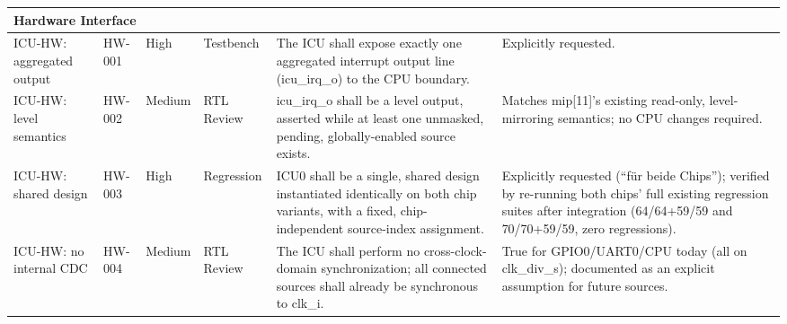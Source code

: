 \begin{longtable}{| p{} | p{} | p{} | p{} | p{} | p{} |}
\multicolumn{6}{|l|}{Hardware Interface}\\
\hline
ICU-HW: aggregated output & HW-001 & High & Testbench &
  The ICU shall expose exactly one aggregated interrupt output line
  (icu\_irq\_o) to the CPU boundary. &
  Explicitly requested. \\
\hline
ICU-HW: level semantics & HW-002 & Medium & RTL Review &
  icu\_irq\_o shall be a level output, asserted while at least one
  unmasked, pending, globally-enabled source exists. &
  Matches mip[11]'s existing read-only, level-mirroring semantics; no CPU
  changes required. \\
\hline
ICU-HW: shared design & HW-003 & High & Regression &
  ICU0 shall be a single, shared design instantiated identically on both
  chip variants, with a fixed, chip-independent source-index assignment. &
  Explicitly requested (``f\"ur beide Chips''); verified by re-running
  both chips' full existing regression suites after integration
  (64/64+59/59 and 70/70+59/59, zero regressions). \\
\hline
ICU-HW: no internal CDC & HW-004 & Medium & RTL Review &
  The ICU shall perform no cross-clock-domain synchronization; all
  connected sources shall already be synchronous to clk\_i. &
  True for GPIO0/UART0/CPU today (all on clk\_div\_s); documented as an explicit assumption for future sources. \\
\hline
\end{longtable}
